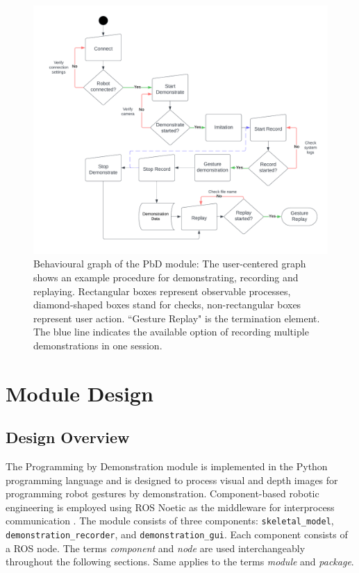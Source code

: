 \documentclass{CSSRforAfrica}
\begin{document}
\begin{figure}[htbp]
    \centering
    \includegraphics[width=\textwidth]{figures/BehaviouralGraph.png}
    \captionsetup{width=\textwidth}
    \caption{Behavioural graph of the PbD module: The user-centered graph shows an example procedure for demonstrating, recording and replaying. Rectangular boxes represent observable processes, diamond-shaped boxes stand for checks, non-rectangular boxes represent user action. ``Gesture Replay" is the termination element. The blue line indicates the available option of recording multiple demonstrations in one session.}
    \label{fig:behaviouralgraph}
\end{figure}  

\newpage

\section{Module Design}

\subsection{Design Overview}
The Programming by Demonstration module is implemented in the Python programming language and is designed to process visual and depth images for programming robot gestures by demonstration. Component-based robotic engineering \cite{brugali2010component} is employed using ROS Noetic as the middleware for interprocess communication \cite{Quigleyetal09}. The module consists of three components: \texttt{skeletal\_model}, \texttt{demonstration\_recorder}, and \texttt{demonstration\_gui}. Each component consists of a ROS node. The terms \textit{component} and \textit{node} are used interchangeably throughout the following sections. Same applies to the terms \textit{module} and \textit{package}.
\end{document}
